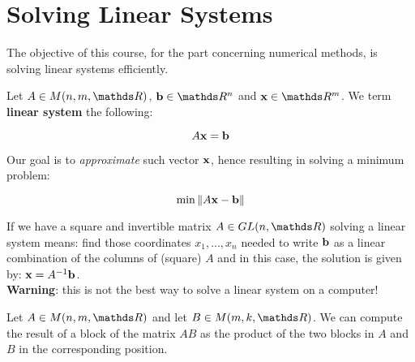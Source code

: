 \documentclass[computationalMathematics.tex]{subfiles}
\begin{document}
\section{Solving Linear Systems}
The objective of this course, for the part concerning numerical methods, is solving linear systems efficiently.

\begin{definition}
  Let $A \in M(n, m, \R)$, $\vect{b} \in \R^n$ and $\vect{x} \in \R^m$. We term \textbf{linear system} the following:

  \[
A{\bf x } = {\bf b }
  \]
\end{definition}

\noindent Our goal is to \emph{approximate} such vector ${\bf x }$, hence resulting in solving a minimum problem:

\[
  \min\limits \left\lVert A{\bf x } - {\bf b }\right\rVert
\]

If we have a square and invertible matrix $A \in GL(n, \R)$ solving a linear system means: find those coordinates $x_1, \dots , x_n$ needed to write ${\bf b }$ as a linear combination of the columns of (square) $A$ and in this case, the solution is given by: ${\bf x } = {A}^{-1}{\bf b }$. \\
\textbf{Warning}: this is not the best way to solve a linear system on a computer!\\


\begin{definition}
  Let $A \in M(n,m, \R)$ and let $B \in M(m, k, \R)$. We can compute the result of a block of the matrix $AB$ as the product of the two blocks in $A$ and $B$ in the corresponding position.
\end{definition}
\end{document}

